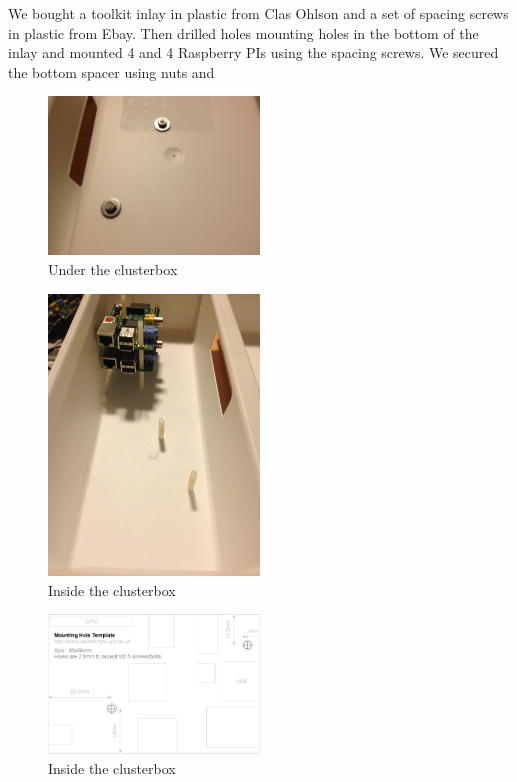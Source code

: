 We bought a toolkit inlay in plastic from Clas Ohlson and a set of spacing screws in plastic from Ebay. Then drilled holes mounting holes in the bottom of the inlay and mounted 4 and 4 Raspberry PIs using the spacing screws. We secured the bottom spacer using nuts and 


\begin{figure}[h]
	\centering
    \includegraphics[width=0.5\textwidth]{thebuild/cluster_under.jpg}
    \caption{Under the clusterbox}
    \label{fig:build_cluster_under}
\end{figure}

\begin{figure}[h]
	\centering
    \includegraphics[width=0.5\textwidth]{thebuild/cluster_inside.jpg}
    \caption{Inside the clusterbox}
    \label{fig:build_cluster_inside}
\end{figure}

\begin{figure}[h]
    \centering
    \includegraphics[width=0.5\textwidth]{thebuild/raspberrypi_mounting_holes.png}
    \caption{Inside the clusterbox}
    \label{fig:build_cluster_inside}
\end{figure}

